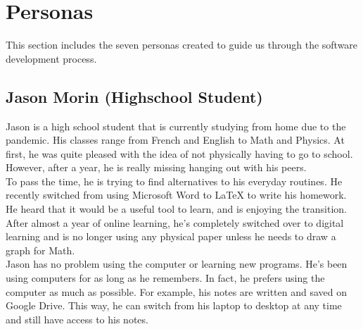 \documentclass[11pt,onside]{report}
\begin{document}
\section{Personas}
This section includes the seven personas created to guide us through the software development process.

\subsection{Jason Morin (Highschool Student)}
Jason is a high school student that is currently studying from home due to the pandemic. His classes range from French and English to Math and Physics. At first, he was quite pleased with the idea of not physically having to go to school. However, after a year, he is really missing hanging out with his peers. \\

To pass the time, he is trying to find alternatives to his everyday routines. He recently switched from using Microsoft Word to \LaTeX{} to write his homework. He heard that it would be a useful tool to learn, and is enjoying the transition. After almost a year of online learning, he’s completely switched over to digital learning and is no longer using any physical paper unless he needs to draw a graph for Math.  \\

Jason has no problem using the computer or learning new programs. He’s been using computers for as long as he remembers. In fact, he prefers using the computer as much as possible. For example, his notes are written and saved on Google Drive. This way, he can switch from his laptop to desktop at any time and still have access to his notes. \\
\end{document}
